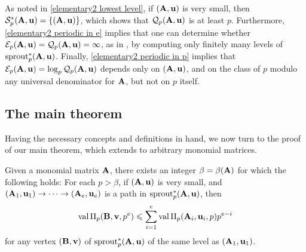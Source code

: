 \documentclass{amsart}
\begin{document}
\begin{remark}
\label{curly-Q-E-basic-facts: R}
As noted in \eqref{elementary2 lowest level}, if $(\mathbf{A},\mathbf{u})$ is very small, then $\mathcal{S}^{\ast}_p(\mathbf{A},\mathbf{u}) = \{ (\mathbf{A},\mathbf{u} )\}$, which shows that $\mathcal{Q}_p(\mathbf{A},\mathbf{u})$ is at least $p$.
Furthermore, \eqref{elementary2 periodic in e} implies that one can determine whether $\mathcal{E}_p(\mathbf{A}, \mathbf{u}) = \mathcal{Q}_p(\mathbf{A},\mathbf{u}) = \infty$, as in , by computing only finitely many levels of $\operatorname{sprout}_p^*(\mathbf{A},\mathbf{u})$.
Finally, \eqref{elementary2 periodic in p} implies that $\mathcal{E}_p(\mathbf{A},\mathbf{u}) = \log_p \mathcal{Q}_p(\mathbf{A},\mathbf{u})$ depends only on $(\mathbf{A},\mathbf{u})$, and on the class of $p$ modulo any universal denominator for $\mathbf{A}$, but not on $p$ itself.

\end{remark}

\subsection{The main theorem}

Having the necessary concepts and definitions in hand, we now turn to the proof of our main theorem, which extends  to arbitrary monomial matrices.

\begin{lemma}\label{lem: upper bound for higher mu}
   Given a monomial matrix $\mathbf{A}$, there exists an integer $\beta= \beta(\mathbf{A})$ for which the following holds\textup:
   For each $p>\beta$, if $(\mathbf{A}, \mathbf{u})$ is very small, and $(\mathbf{A}_1, \mathbf{u}_1) \to \cdots \to (\mathbf{A}_e, \mathbf{u}_e)$ is a path in $\operatorname{sprout}^{\ast}_p(\mathbf{A},\mathbf{u})$,  then
   \[
      \operatorname{val} \Pi_p(\mathbf{B}, \mathbf{v}, p^e) \leqslant \sum_{i=1}^e \operatorname{val} \Pi_p(\mathbf{A}_i, \mathbf{u}_i, p)p^{e-i}
   \]
   for any vertex $(\mathbf{B}, \mathbf{v})$ of $\operatorname{sprout}^{\ast}_p(\mathbf{A},\mathbf{u})$ of the same level as $(\mathbf{A}_1, \mathbf{u}_1)$.
\end{lemma}
\end{document}

